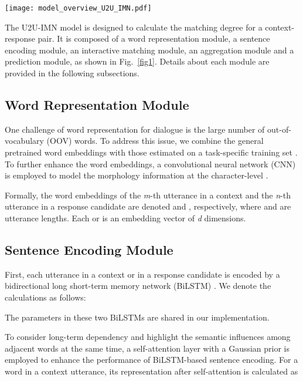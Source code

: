 \documentclass[journal]{IEEEtran}
\begin{document}
    \begin{figure*}
    \centering
    \texttt{[image: model\_overview\_U2U\_IMN.pdf]}
    \caption{The overall architecture of our proposed U2U-IMN model.}
    \label{fig1}
    \end{figure*}

    The U2U-IMN model is designed to calculate the matching degree  for a context-response pair. It is composed of a word representation module, a sentence encoding module, an interactive matching module, an aggregation module and a prediction module, as shown in Fig.~\ref{fig1}. Details about each module are provided in the following subsections.

  \subsection{Word Representation Module}
    One challenge of word representation for dialogue is the large number of out-of-vocabulary (OOV) words.
    To address this issue, we combine the general pretrained word embeddings with those estimated on a task-specific training set \cite{DBLP:journals/corr/abs-1802-02614}.
    To further enhance the word embeddings, a convolutional neural network (CNN) is employed to model the morphology information at the character-level \cite{DBLP:conf/emnlp/LeeHLZ17}.

    Formally, the word embeddings of the \emph{m}-th utterance in a context and the \emph{n}-th utterance in a response candidate are denoted  and , respectively, where  and  are utterance lengths. Each  or  is an embedding vector of \emph{d} dimensions.

  \subsection{Sentence Encoding Module}
    First, each utterance in a context or in a response candidate is encoded by a bidirectional long short-term memory network (BiLSTM) \cite{DBLP:journals/neco/HochreiterS97}. We denote the calculations as follows:
    
    The parameters in these two BiLSTMs are shared in our implementation.

    To consider long-term dependency and highlight the semantic influences among adjacent words at the same time, a self-attention layer \cite{DBLP:conf/iclr/YuDLZ00L18} with a Gaussian prior \cite{guo2019gaussian} is employed to enhance the performance of BiLSTM-based sentence encoding.
    For a word in a context utterance, its representation after self-attention is calculated as
    
\end{document}
